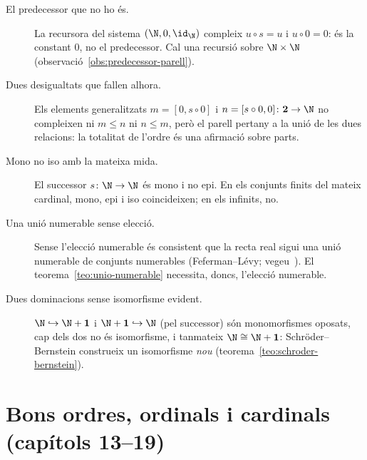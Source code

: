 \begin{description}
\item[El predecessor que no ho és.] La recursora del sistema
\((\N,0,\id_\N)\) compleix \(u\circ s=u\) i \(u\circ0=0\): és la constant
\(0\), no el predecessor. Cal una recursió sobre \(\N\times\N\)
(observació~\ref{obs:predecessor-parell}).

\item[Dues desigualtats que fallen alhora.] Els elements generalitzats
\(m=[0,s\circ0]\) i \(n=[s\circ0,0]\colon\mathbf2\to\N\) no compleixen ni \(m\le n\) ni
\(n\le m\), però el parell pertany a la unió de les dues relacions: la
totalitat de l'ordre és una afirmació sobre parts.

\item[Mono no iso amb la mateixa mida.] El successor \(s\colon\N\to\N\) és
mono i no epi. En els conjunts finits del mateix cardinal, mono, epi i iso
coincideixen; en els infinits, no.

\item[Una unió numerable sense elecció.] Sense l'elecció numerable és
consistent que la recta real sigui una unió numerable de conjunts
numerables (Feferman--Lévy; vegeu~\cite{jech2003}). El
teorema~\ref{teo:unio-numerable} necessita, doncs, l'elecció numerable.

\item[Dues dominacions sense isomorfisme evident.] \(\N\hookrightarrow\N+\mathbf1\)
i \(\N+\mathbf1\hookrightarrow\N\) (pel successor) són monomorfismes oposats,
cap dels dos no és isomorfisme, i tanmateix \(\N\cong\N+\mathbf1\):
Schröder--Bernstein construeix un isomorfisme \emph{nou}
(teorema~\ref{teo:schroder-bernstein}).
\end{description}

\section*{Bons ordres, ordinals i cardinals (capítols 13--19)}

